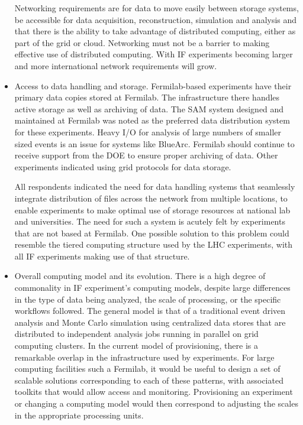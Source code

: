 \begin{itemize}
Networking requirements are for data to move  easily between storage systems,
be accessible for data acquisition, reconstruction, simulation and analysis
and that there is the ability to take advantage of distributed computing,
either as part of the grid or cloud.  Networking must not be a barrier to
making effective use of distributed computing. With IF experiments
becoming larger and more international network requirements will grow.

\item Access to data handling and storage.   Fermilab-based experiments have
their primary data copies stored at Fermilab.  The infrastructure there
handles active storage as well as archiving of data.  The SAM system designed
and maintained at Fermilab was noted as the preferred data distribution system
for these experiments. Heavy I/O for analysis of large numbers of smaller
sized events is an issue for systems like BlueArc. Fermilab should continue to
receive support from the DOE to ensure proper archiving of data. Other
experiments indicated using grid protocols for data storage.

All respondents indicated the need for data handling systems that seamlessly
integrate distribution of files across the network from multiple locations, to
enable experiments to make optimal use of storage resources at national lab
and universities.  The need for such a system is acutely felt by experiments
that are not based at Fermilab.  One possible solution to this problem could
resemble the tiered computing structure used by the LHC experiments, with all
IF experiments making use of that structure.


\item Overall computing model and its evolution.  There is a high degree of
commonality in IF experiment's computing models, despite large differences in
the type of data being analyzed, the scale of processing, or the specific
workflows followed.   The general model is that of a traditional event driven
analysis and Monte Carlo simulation using centralized data stores that are
distributed to independent analysis jobs running in parallel on grid computing
clusters.  In the current model of provisioning, there is a remarkable overlap
in the infrastructure used by experiments. For large computing facilities such
a Fermilab, it would be useful to design a set of scalable solutions
corresponding to each of these patterns, with associated toolkits that would
allow access and monitoring. Provisioning an experiment or changing a
computing model would then correspond to adjusting the scales in the
appropriate processing units.


\end{itemize}
